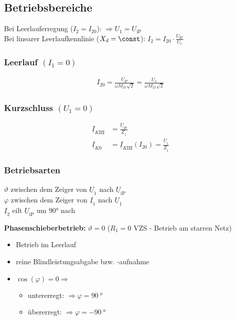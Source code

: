 \begin{sectionbox}
\subsection{Betriebsbereiche}
Bei Leerlauferregung ($I_2 = I_{20}$): $\Rightarrow U_1 = U_\text{iP}$\\
Bei linearer Leerlaufkennlinie ($X_d = \const$): $I_2 = I_{20}\cdot\frac{U_\text{iP}}{U_1}$

\subsubsection{Leerlauf $(I_1 = 0)$}
\begin{align*}
I_{20} = \frac{U_\text{iP}}{\omega M_{21} \sqrt{2}} = \frac{U_1}{\omega M_{21} \sqrt{2}}
\end{align*}

\subsubsection{Kurzschluss $(U_1 = 0)$}
\begin{align*}
\underline I_{K\textrm{III}} &= \frac{\underline{U}_\text{iP}}{\underline{Z}_1}\\
\underline{I}_{K0} &= \underline I_{K\textrm{III}}(I_{20}) = \frac{\underline{U}_1}{\underline{Z}_1}
\end{align*}

\subsubsection{Betriebsarten}
\begin{symbolbox}
$\vartheta$ zwischen dem Zeiger von $\underline{U}_1$ nach $\underline{U}_\text{iP}$\\
$\varphi$ zwischen dem Zeiger von $\underline{I}_1$ nach $\underline{U}_1$\\
$\underline I_2$ eilt $\underline U_\text{iP}$ um $\ang{90}$ nach
\end{symbolbox}

\textbf{Phasenschieberbetrieb:} $\vartheta = 0$ ($R_1 = 0$ VZS - Betrieb am starren Netz)
\begin{itemize}
\item Betrieb im Leerlauf
\item reine Blindleistungsabgabe bzw. -aufnahme
\item $\cos(\varphi) = 0\Rightarrow$
\begin{itemize}
\item untererregt: $\Rightarrow\varphi = \SI{90}{\degree}$
\item übererregt: $\Rightarrow\varphi = \SI{-90}{\degree}$
\end{itemize}
\end{itemize}


\end{sectionbox}
